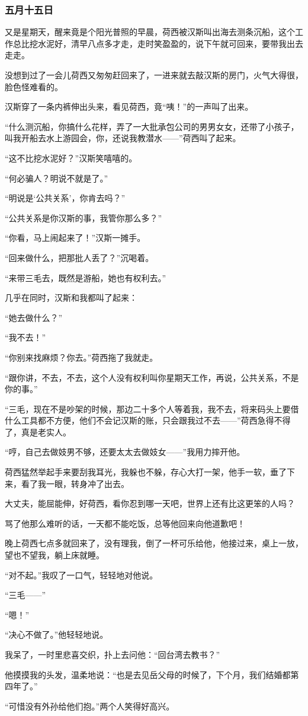 \subsubsection{五月十五日}
\par 又是星期天，醒来竟是个阳光普照的早晨，荷西被汉斯叫出海去测条沉船，这个工作总比挖水泥好，清早八点多才走，走时笑盈盈的，说下午就可回来，要带我出去走走。
\par 没想到过了一会儿荷西又匆匆赶回来了，一进来就去敲汉斯的房门，火气大得很，脸色怪难看的。
\par 汉斯穿了一条内裤伸出头来，看见荷西，竟“咦！”的一声叫了出来。
\par “什么测沉船，你搞什么花样，弄了一大批承包公司的男男女女，还带了小孩子，叫我开船去水上游园会，你，还说我教潜水——”荷西叫了起来。
\par “这不比挖水泥好？”汉斯笑嘻嘻的。
\par “何必骗人？明说不就是了。”
\par “明说是‘公共关系’，你肯去吗？”
\par “公共关系是你汉斯的事，我管你那么多？”
\par “你看，马上闹起来了！”汉斯一摊手。
\par “回来做什么，把那批人丢了？”沉喝着。
\par “来带三毛去，既然是游船，她也有权利去。”
\par 几乎在同时，汉斯和我都叫了起来：
\par “她去做什么？”
\par “我不去！”
\par “你别来找麻烦？你去。”荷西拖了我就走。
\par “跟你讲，不去，不去，这个人没有权利叫你星期天工作，再说，公共关系，不是你的事。”
\par “三毛，现在不是吵架的时候，那边二十多个人等着我，我不去，将来码头上要借什么工具都不方便，他们不会记汉斯的账，只会跟我过不去——”荷西急得不得了，真是老实人。
\par “哼，自己去做妓男不够，还要太太去做妓女——”我用力摔开他。
\par 荷西猛然举起手来要刮我耳光，我躲也不躲，存心大打一架，他手一软，垂了下来，看了我一眼，转身冲了出去。
\par 大丈夫，能屈能伸，好荷西，看你忍到哪一天吧，世界上还有比这更笨的人吗？
\par 骂了他那么难听的话，一天都不能吃饭，总等他回来向他道歉吧！
\par 晚上荷西七点多就回来了，没有理我，倒了一杯可乐给他，他接过来，桌上一放，望也不望我，躺上床就睡。
\par “对不起。”我叹了一口气，轻轻地对他说。
\par “三毛——”
\par “嗯！”
\par “决心不做了。”他轻轻地说。
\par 我呆了，一时里悲喜交织，扑上去问他：“回台湾去教书？”
\par 他摸摸我的头发，温柔地说：“也是去见岳父母的时候了，下个月，我们结婚都第四年了。”
\par “可惜没有外孙给他们抱。”两个人笑得好高兴。


